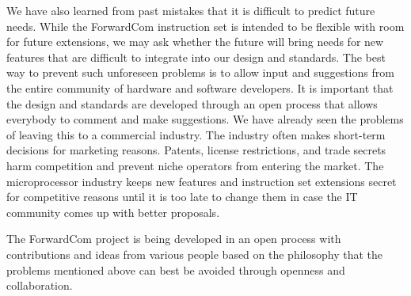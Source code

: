 \documentclass[forwardcom.tex]{subfiles}
\begin{document}
We have also learned from past mistakes that it is difficult to predict future needs. While the ForwardCom instruction set is intended to be flexible with room for future extensions, we may ask whether the future will bring needs for new features that are difficult to integrate into our design and standards. The best way to prevent such unforeseen problems is to allow input and suggestions from the entire community of hardware and software developers. It is important that the design and standards are developed through an open process that allows everybody to comment and make suggestions. We have already seen the problems of leaving this to a commercial industry. The industry often makes short-term decisions for marketing reasons. Patents, license restrictions, and trade secrets harm competition and prevent niche operators from entering the market. The microprocessor industry keeps new features and instruction set extensions secret for competitive reasons until it is too late to change them in case the IT community comes up with better proposals.
\vspace{2mm}

The ForwardCom project is being developed in an open process with contributions and ideas from various people based on the philosophy that the problems mentioned above can best be avoided through openness and collaboration.
\end{document}
